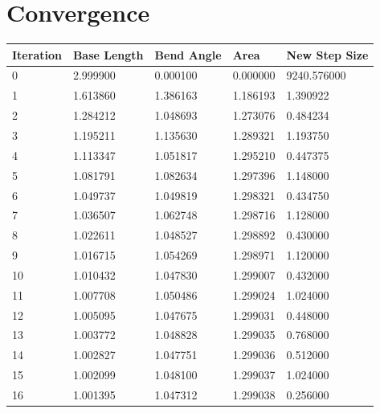 \documentclass{article}
\begin{document}
\section*{Convergence}
\begin{table}[h]
\begin{tabular}{|l|ll|l|l|}
\hline
Iteration & \multicolumn{1}{l|}{Base Length} & Bend Angle & Area     & New Step Size \\ \hline
0         & 2.999900                         & 0.000100   & 0.000000 & 9240.576000   \\ \hline
1         & 1.613860                         & 1.386163   & 1.186193 & 1.390922      \\ \hline
2         & 1.284212                         & 1.048693   & 1.273076 & 0.484234      \\ \hline
3         & 1.195211                         & 1.135630   & 1.289321 & 1.193750      \\ \hline
4         & 1.113347                         & 1.051817   & 1.295210 & 0.447375      \\ \hline
5         & 1.081791                         & 1.082634   & 1.297396 & 1.148000      \\ \hline
6         & 1.049737                         & 1.049819   & 1.298321 & 0.434750      \\ \hline
7         & 1.036507                         & 1.062748   & 1.298716 & 1.128000      \\ \hline
8         & 1.022611                         & 1.048527   & 1.298892 & 0.430000      \\ \hline
9         & 1.016715                         & 1.054269   & 1.298971 & 1.120000      \\ \hline
10        & 1.010432                         & 1.047830   & 1.299007 & 0.432000      \\ \hline
11        & 1.007708                         & 1.050486   & 1.299024 & 1.024000      \\ \hline
12        & 1.005095                         & 1.047675   & 1.299031 & 0.448000      \\ \hline
13        & 1.003772                         & 1.048828   & 1.299035 & 0.768000      \\ \hline
14        & 1.002827                         & 1.047751   & 1.299036 & 0.512000      \\ \hline
15        & 1.002099                         & 1.048100   & 1.299037 & 1.024000      \\ \hline
16        & 1.001395                         & 1.047312   & 1.299038 & 0.256000      \\ \hline
\end{tabular}
\end{table}
\end{document}
